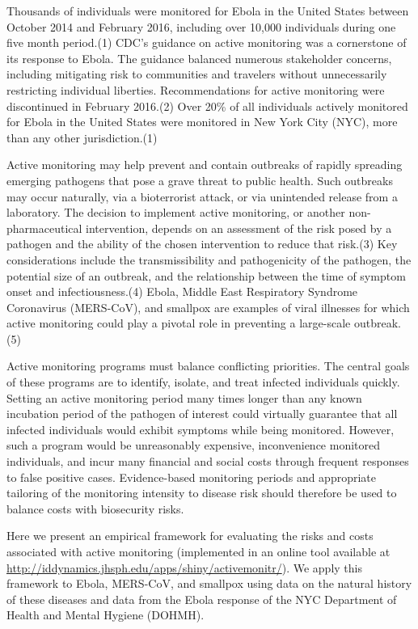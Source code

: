 \documentclass[]{article}
\begin{document}
Thousands of individuals were monitored for Ebola in the United States
between October 2014 and February 2016, including over 10,000
individuals during one five month period.(1) CDC's guidance on active
monitoring was a cornerstone of its response to Ebola. The guidance
balanced numerous stakeholder concerns, including mitigating risk to
communities and travelers without unnecessarily restricting individual
liberties. Recommendations for active monitoring were discontinued in
February 2016.(2) Over 20\% of all individuals actively monitored for
Ebola in the United States were monitored in New York City (NYC), more
than any other jurisdiction.(1)

Active monitoring may help prevent and contain outbreaks of rapidly
spreading emerging pathogens that pose a grave threat to public health.
Such outbreaks may occur naturally, via a bioterrorist attack, or via
unintended release from a laboratory. The decision to implement active
monitoring, or another non-pharmaceutical intervention, depends on an
assessment of the risk posed by a pathogen and the ability of the chosen
intervention to reduce that risk.(3) Key considerations include the
transmissibility and pathogenicity of the pathogen, the potential size
of an outbreak, and the relationship between the time of symptom onset
and infectiousness.(4) Ebola, Middle East Respiratory Syndrome
Coronavirus (MERS-CoV), and smallpox are examples of viral illnesses for
which active monitoring could play a pivotal role in preventing a
large-scale outbreak.(5)

Active monitoring programs must balance conflicting priorities. The
central goals of these programs are to identify, isolate, and treat
infected individuals quickly. Setting an active monitoring period many
times longer than any known incubation period of the pathogen of
interest could virtually guarantee that all infected individuals would
exhibit symptoms while being monitored. However, such a program would be
unreasonably expensive, inconvenience monitored individuals, and incur
many financial and social costs through frequent responses to false
positive cases. Evidence-based monitoring periods and appropriate
tailoring of the monitoring intensity to disease risk should therefore
be used to balance costs with biosecurity risks.

Here we present an empirical framework for evaluating the risks and
costs associated with active monitoring (implemented in an online tool
available at
\url{http://iddynamics.jhsph.edu/apps/shiny/activemonitr/}). We apply
this framework to Ebola, MERS-CoV, and smallpox using data on the
natural history of these diseases and data from the Ebola response of
the NYC Department of Health and Mental Hygiene (DOHMH).
\end{document}

